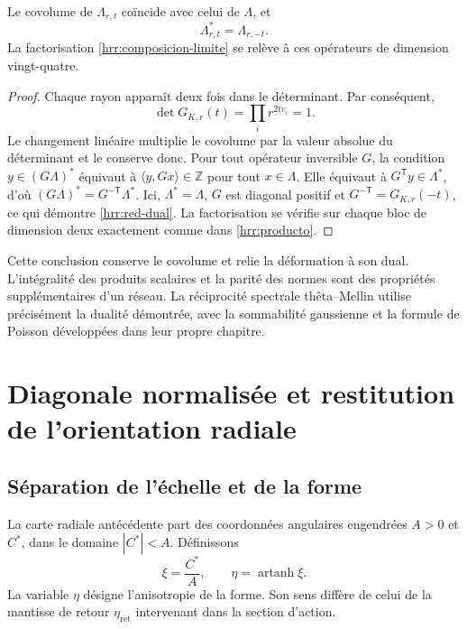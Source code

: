 \begin{proposition}
\label{hrr:redes} Le covolume de \(\Lambda_{r,t}\) coïncide avec celui de \(\Lambda\), et
\begin{equation}
 \Lambda_{r,t}^{*}=\Lambda_{r,-t}.
 \label{hrr:red-dual}
\end{equation}
La factorisation \eqref{hrr:composicion-limite} se relève à ces opérateurs de dimension vingt-quatre.
\end{proposition}
\begin{proof}
Chaque rayon apparaît deux fois dans le déterminant. Par conséquent,
\[
 \det G_{K,r}(t)=\prod_i r^{2tv_i}=1.
\]
Le changement linéaire multiplie le covolume par la valeur absolue du déterminant et le conserve donc. Pour tout opérateur inversible \(G\), la condition \(y\in(G\Lambda)^*\) équivaut à \(\langle y,Gx\rangle\in\mathbb Z\) pour tout \(x\in\Lambda\). Elle équivaut à \(G^{\mathsf T}y\in\Lambda^*\), d’où \((G\Lambda)^*=G^{-\mathsf T}\Lambda^*\). Ici, \(\Lambda^*=\Lambda\), \(G\) est diagonal positif et \(G^{-\mathsf T}=G_{K,r}(-t)\), ce qui démontre \eqref{hrr:red-dual}. La factorisation se vérifie sur chaque bloc de dimension deux exactement comme dans \eqref{hrr:producto}.
\end{proof}

Cette conclusion conserve le covolume et relie la déformation à son dual. L’intégralité des produits scalaires et la parité des normes sont des propriétés supplémentaires d’un réseau. La réciprocité spectrale thêta--Mellin utilise précisément la dualité démontrée, avec la sommabilité gaussienne et la formule de Poisson développées dans leur propre chapitre.

\section{Diagonale normalisée et restitution de l’orientation radiale}
\label{hrr:diagonal}

\subsection{Séparation de l’échelle et de la forme}

La carte radiale antécédente part des coordonnées angulaires engendrées \(A>0\) et \(C^*\), dans le domaine \(|C^*|<A\). Définissons
\[
 \xi=\frac{C^*}{A},\qquad
 \eta=\operatorname{artanh}\xi.
\]
La variable \(\eta\) désigne l’anisotropie de la forme. Son sens diffère de celui de la mantisse de retour \(\eta_{\mathrm{ret}}\) intervenant dans la section d’action.

